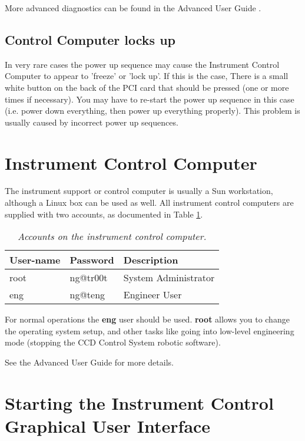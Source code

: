 \documentclass[10pt,a4paper]{article}
\begin{document}
More advanced diagnostics can be found in the Advanced User Guide \cite{bib:ccs_aug}.

\subsection{Control Computer locks up}
In very rare cases the power up sequence may cause the Instrument Control Computer to appear to 'freeze' or 'lock up'.
If this is the case, There is a small white button on the back of the PCI card that should be pressed (one or
more times if necessary). You may have to re-start the power up sequence in this case (i.e. power down everything,
then power up everything properly). This problem is usually caused by incorrect power up sequences.

\section{Instrument Control Computer}
\label{sec:instrumentcontrolcomputer}

The instrument support or control computer is usually a Sun workstation, although a Linux box can be used as well.
All instrument control computers are supplied with two accounts, as documented in Table \ref{tab:iscaccounts}.

\begin{table}[!h]
\begin{center}
\begin{tabular}{|l|l|p{10em}|}
\hline
{\bf User-name} & {\bf Password} 	& {\bf Description} \\ \hline
root 		& ng@tr00t 		& System Administrator \\ \hline
eng 		& ng@teng 		& Engineer User \\ \hline
\end{tabular}
\end{center}
\caption{\em Accounts on the instrument control computer.}
\label{tab:iscaccounts}
\end{table}

For normal operations the {\bf eng} user should be used. {\bf root} allows you to change the operating system
setup, and other tasks like going into low-level engineering mode (stopping the CCD Control System
robotic software).

See the Advanced User Guide \cite{bib:ccs_aug} for more details.

\section{Starting the Instrument Control Graphical User Interface}
\label{sec:starticsgui}
\end{document}
